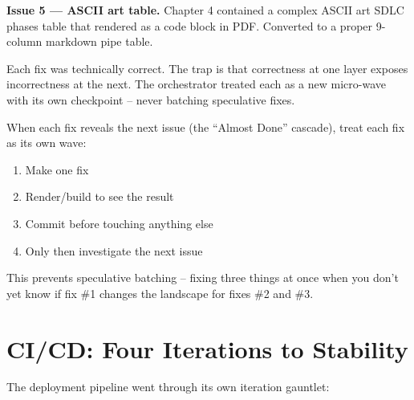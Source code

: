 \documentclass[
  a4paper,
  DIV=11,
  numbers=noendperiod]{scrreprt}
\providecommand{\tightlist}{%
  \setlength{\itemsep}{0pt}\setlength{\parskip}{0pt}}
\begin{document}
\textbf{Issue 5 --- ASCII art table.} Chapter 4 contained a complex
ASCII art SDLC phases table that rendered as a code block in PDF.
Converted to a proper 9-column markdown pipe table.

Each fix was technically correct. The trap is that correctness at one
layer exposes incorrectness at the next. The orchestrator treated each
as a new micro-wave with its own checkpoint -- never batching
speculative fixes.

\begin{tcolorbox}[enhanced jigsaw, arc=.35mm, bottomrule=.15mm, bottomtitle=1mm, breakable, colback=white, colbacktitle=quarto-callout-tip-color!10!white, colframe=quarto-callout-tip-color-frame, coltitle=black, left=2mm, leftrule=.75mm, opacityback=0, opacitybacktitle=0.6, rightrule=.15mm, title=\textcolor{quarto-callout-tip-color}{\faLightbulb}\hspace{0.5em}{Try This: Micro-Wave Checkpoints for Cascade Fixes}, titlerule=0mm, toprule=.15mm, toptitle=1mm]

When each fix reveals the next issue (the ``Almost Done'' cascade),
treat each fix as its own wave:

\begin{enumerate}
\def\labelenumi{\arabic{enumi}.}
\tightlist
\item
  Make one fix
\item
  Render/build to see the result
\item
  Commit before touching anything else
\item
  Only then investigate the next issue
\end{enumerate}

This prevents speculative batching -- fixing three things at once when
you don't yet know if fix \#1 changes the landscape for fixes \#2 and
\#3.

\end{tcolorbox}

\section{CI/CD: Four Iterations to
Stability}\label{cicd-four-iterations-to-stability}

The deployment pipeline went through its own iteration gauntlet:
\end{document}

